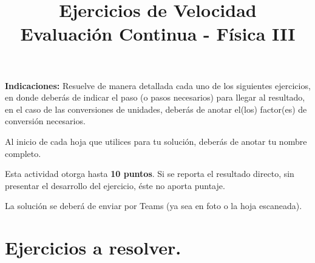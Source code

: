 \documentclass[14pt]{extarticle}
\title{\vspace*{-2cm} Ejercicios de Velocidad \\  Evaluación Continua - Física III\vspace{-5ex}}
\date{}
\begin{document}
\maketitle

\textbf{Indicaciones:} Resuelve de manera detallada cada uno de los siguientes ejercicios, en donde deberás de indicar el paso (o pasos necesarios) para llegar al resultado, en el caso de las conversiones de unidades, deberás de anotar el(los) factor(es) de conversión necesarios.
\par
Al inicio de cada hoja que utilices para tu solución, deberás de anotar tu nombre completo.
\par
Esta actividad otorga hasta \textbf{10 puntos}. Si se reporta el resultado directo, sin presentar el desarrollo del ejercicio, éste no aporta puntaje.
\par
La solución se deberá de enviar por Teams (ya sea en foto o la hoja escaneada).

\section*{Ejercicios a resolver.}
\end{document}
